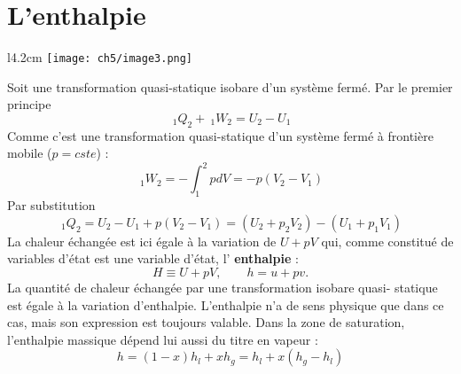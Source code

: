 \section{L'enthalpie}
\begin{wrapfigure}[9]{l}{4.2cm}
	\vspace{-7mm}
	\texttt{[image: ch5/image3.png]}
\end{wrapfigure}
Soit une transformation quasi-statique isobare d'un système fermé. Par 
le premier principe
\begin{equation}
\ _1Q_2 + \ _1W_2 = U_2-U_1
\end{equation}
Comme c'est une transformation quasi-statique d'un système fermé à 
frontière mobile ($p=cste$) :
\begin{equation}
\ _1W_2 = -\int_1^2 pdV = -p(V_2-V_1)
\end{equation}
Par substitution
\begin{equation}
\ _1Q_2 = U_2-U_1 + p(V_2-V_1) = (U_2+p_2V_2)-(U_1+p_1V_1)
\end{equation}
La chaleur échangée est ici égale à la variation de $U+pV$ qui, comme 
constitué de variables d'état est une variable d'état, l'\textbf{%
enthalpie} :
\begin{equation}
H \equiv U + pV,\qquad h = u +pv.
\end{equation}
La quantité de chaleur échangée par une transformation isobare quasi-%
statique est égale à la variation d'enthalpie. L'enthalpie n'a de 
sens physique que dans ce cas, mais son expression est toujours 
valable. Dans la zone de saturation, l'enthalpie massique dépend lui 
aussi du titre en vapeur :
\begin{equation}
h = (1-x)h_l + xh_g = h_l+x(h_g-h_l)
\end{equation}


